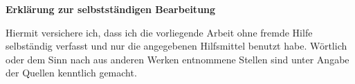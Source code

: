\ifdefined\ISuppressStatement
\else
\clearpage
\thispagestyle{plain}
\ITocEntryStatement
\textbf{\sffamily\large Erklärung zur selbstständigen Bearbeitung}

Hiermit versichere ich, dass ich die vorliegende
Arbeit ohne fremde Hilfe selbständig verfasst und nur die
angegebenen Hilfsmittel benutzt habe.
Wörtlich oder dem Sinn nach aus anderen Werken entnommene Stellen sind unter
Angabe der Quellen kenntlich gemacht.

\vspace{1cm}
\noindent\makebox[3cm]{\hrulefill} \hspace{0.1cm}
    \makebox[3cm]{\hrulefill} \hspace{0.1cm}
    \makebox[6cm]{\hrulefill} \\
\noindent{} \hspace{0.1cm}
     \hspace{0.1cm}

\clearpage
\fi